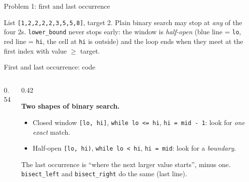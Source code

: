 \documentclass[aspectratio=169,10pt]{beamer}
\begin{document}
\begin{frame}{Problem 1: first and last occurrence}
\begin{sfig}[0.62]
\begin{tikzpicture}
  
\end{tikzpicture}
\end{sfig}
\vspace{1mm}
{\small List \texttt{[1,2,2,2,2,3,5,5,8]}, target 2. Plain binary search may stop at \emph{any} of the four 2s. \texttt{lower\_bound} never stops early: the window is \emph{half-open} (blue line = \texttt{lo}, red line = \texttt{hi}, the cell at \texttt{hi} is outside) and the loop ends when they meet at the first index with value $\ge$ target.}
\end{frame}

\begin{frame}{First and last occurrence: code}
\begin{columns}[T]
\begin{column}{0.54\textwidth}
\vspace{1mm}
\end{column}
\begin{column}{0.42\textwidth}
\vspace{2mm}
{\small
\textbf{Two shapes of binary search.}
\begin{itemize}\setlength\itemsep{2pt}
\item Closed window \texttt{[lo, hi]}, \texttt{while lo <= hi}, \texttt{hi = mid - 1}: look for \emph{one exact} match.
\item Half-open \texttt{[lo, hi)}, \texttt{while lo < hi}, \texttt{hi = mid}: look for a \emph{boundary}.
\end{itemize}
The last occurrence is ``where the next larger value starts'', minus one. \texttt{bisect\_left} and \texttt{bisect\_right} do the same (last line).}
\end{column}
\end{columns}
\end{frame}
\end{document}
